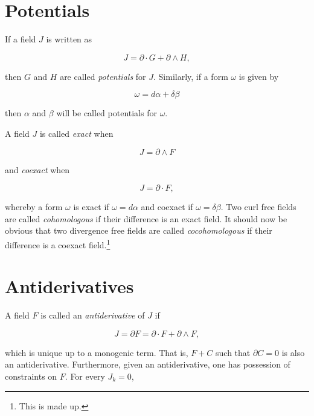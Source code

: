 \documentclass{article}
\begin{document}
\section{Potentials}

If a field $J$ is written as

\begin{equation}
  J = \partial \cdot G + \partial \wedge H,
\end{equation}

then $G$ and $H$ are called \emph{potentials} for $J$. Similarly, if a form $\omega$ is given by

\begin{equation}
  \omega = d \alpha + \delta \beta
\end{equation}

then $\alpha$ and $\beta$ will be called potentials for $\omega$.

A field $J$ is called \emph{exact} when

\begin{equation}
  J = \partial \wedge F
\end{equation}

and \emph{coexact} when

\begin{equation}
  J = \partial \cdot F,
\end{equation}

whereby a form $\omega$ is exact if $\omega = d \alpha$ and coexact if $\omega = \delta \beta$. Two curl free fields are called \emph{cohomologous} if their difference is an exact field. It should now be obvious that two divergence free fields are called \emph{cocohomologous} if their difference is a coexact field.\footnote{This is made up.}

\section{Antiderivatives}

A field $F$ is called an \emph{antiderivative} of $J$ if

\begin{equation}
  J = \partial F = \partial \cdot F + \partial \wedge F,\label{eq:antiderivative}
\end{equation}

which is unique up to a monogenic term. That is, $F + C$ such that $\partial C = 0$ is also an antiderivative. Furthermore, given an antiderivative, one has possession of constraints on $F$. For every $J_k = 0$,
\end{document}
